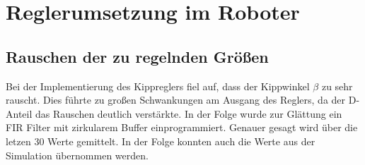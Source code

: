 \renewcommand{\autoren}{Timo Veit, Aleksandar Stoiljkovic}
\newpage
\section{Reglerumsetzung im Roboter}
\subsection{Rauschen der zu regelnden Größen}
Bei der Implementierung des Kippreglers fiel auf, dass der Kippwinkel $\beta$ zu sehr rauscht. Dies führte zu großen Schwankungen am Ausgang des Reglers, da der D-Anteil das Rauschen deutlich verstärkte. In der Folge wurde zur Glättung ein FIR Filter mit zirkularem Buffer einprogrammiert. Genauer gesagt wird über die letzen 30 Werte gemittelt.
In der Folge konnten auch die Werte aus der Simulation übernommen werden.

\newpage
